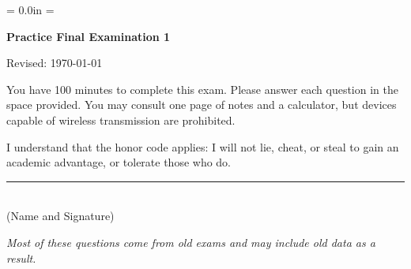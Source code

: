 \documentclass[letterpaper,12pt]{article}
\def\HeadName{Practice Final Examination 1}
\begin{document}
\parindent = 0.0in
\parskip = \bigskipamount
\thispagestyle{empty}%
\Head

\centerline{\large \bf \HeadName}%
\centerline{Revised:  \today}

\bigskip
You have 100 minutes to complete this exam.  Please answer each
question in the space provided. You may consult one page of notes
and a calculator, but devices capable of wireless transmission are
prohibited.

I understand that the honor code applies: I will not lie, cheat,
or steal to gain an academic advantage, or tolerate those who do.

\begin{flushright}
\rule{4in}{0.5pt} \\ (Name and Signature)
\end{flushright}

{\it Most of these questions come from old exams and may include old data as a result. }
\end{document}
